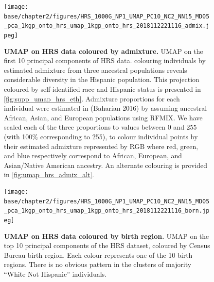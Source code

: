 \newpage

\begin{figure}
\centering
   \texttt{[image: base/chapter2/figures/HRS\_1000G\_NP1\_UMAP\_PC10\_NC2\_NN15\_MD05\_pca\_1kgp\_onto\_hrs\_umap\_1kgp\_onto\_hrs\_2018112221116\_admix.jpeg]}
   \caption[UMAP on HRS data coloured by admixture]{\textbf{UMAP on HRS data coloured by admixture.} UMAP on the first 10 principal components of HRS data. colouring individuals by estimated admixture from three ancestral populations reveals considerable diversity in the Hispanic population. This projection coloured by self-identified race and Hispanic status is presented in \ref{fig:supp_umap_hrs_eth}. Admixture proportions for each individual were estimated in (Baharian 2016) by assuming ancestral African, Asian, and European populations using RFMIX. We have scaled each of the three proportions to values between 0 and 255 (with 100\% corresponding to 255), to colour individual points by their estimated admixture represented by RGB where red, green, and blue respectively correspond to African, European, and Asian/Native American ancestry. An alternate colouring is provided in \ref{fig:umap_hrs_admix_alt}.}
    \label{fig:umap_hrs_admix}
\end{figure}

\newpage

\begin{figure}[ht]
    \centering
    \texttt{[image: base/chapter2/figures/HRS\_1000G\_NP1\_UMAP\_PC10\_NC2\_NN15\_MD05\_pca\_1kgp\_onto\_hrs\_umap\_1kgp\_onto\_hrs\_2018112221116\_born.jpeg]}
    \caption[UMAP on HRS data coloured by birth region]{\textbf{UMAP on HRS data coloured by birth region.} UMAP on the top 10 principal components of the HRS dataset, coloured by Census Bureau birth region. Each colour represents one of the 10 birth regions. There is no obvious pattern in the clusters of majority ``White Not Hispanic'' individuals.}
    \label{fig:supp_hrs_born}
\end{figure}

\newpage

